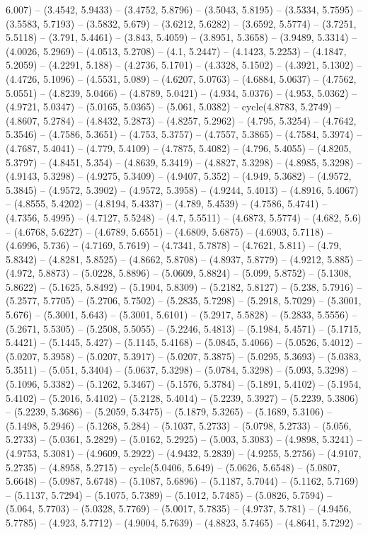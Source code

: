 6.007) -- (3.4542, 5.9433) -- (3.4752, 5.8796) -- (3.5043, 5.8195) -- (3.5334, 5.7595) -- (3.5583, 5.7193) -- (3.5832, 5.679) -- (3.6212, 5.6282) -- (3.6592, 5.5774) -- (3.7251, 5.5118) -- (3.791, 5.4461) -- (3.843, 5.4059) -- (3.8951, 5.3658) -- (3.9489, 5.3314) -- (4.0026, 5.2969) -- (4.0513, 5.2708) -- (4.1, 5.2447) -- (4.1423, 5.2253) -- (4.1847, 5.2059) -- (4.2291, 5.188) -- (4.2736, 5.1701) -- (4.3328, 5.1502) -- (4.3921, 5.1302) -- (4.4726, 5.1096) -- (4.5531, 5.089) -- (4.6207, 5.0763) -- (4.6884, 5.0637) -- (4.7562, 5.0551) -- (4.8239, 5.0466) -- (4.8789, 5.0421) -- (4.934, 5.0376) -- (4.953, 5.0362) -- (4.9721, 5.0347) -- (5.0165, 5.0365) -- (5.061, 5.0382) -- cycle(4.8783, 5.2749) -- (4.8607, 5.2784) -- (4.8432, 5.2873) -- (4.8257, 5.2962) -- (4.795, 5.3254) -- (4.7642, 5.3546) -- (4.7586, 5.3651) -- (4.753, 5.3757) -- (4.7557, 5.3865) -- (4.7584, 5.3974) -- (4.7687, 5.4041) -- (4.779, 5.4109) -- (4.7875, 5.4082) -- (4.796, 5.4055) -- (4.8205, 5.3797) -- (4.8451, 5.354) -- (4.8639, 5.3419) -- (4.8827, 5.3298) -- (4.8985, 5.3298) -- (4.9143, 5.3298) -- (4.9275, 5.3409) -- (4.9407, 5.352) -- (4.949, 5.3682) -- (4.9572, 5.3845) -- (4.9572, 5.3902) -- (4.9572, 5.3958) -- (4.9244, 5.4013) -- (4.8916, 5.4067) -- (4.8555, 5.4202) -- (4.8194, 5.4337) -- (4.789, 5.4539) -- (4.7586, 5.4741) -- (4.7356, 5.4995) -- (4.7127, 5.5248) -- (4.7, 5.5511) -- (4.6873, 5.5774) -- (4.682, 5.6) -- (4.6768, 5.6227) -- (4.6789, 5.6551) -- (4.6809, 5.6875) -- (4.6903, 5.7118) -- (4.6996, 5.736) -- (4.7169, 5.7619) -- (4.7341, 5.7878) -- (4.7621, 5.811) -- (4.79, 5.8342) -- (4.8281, 5.8525) -- (4.8662, 5.8708) -- (4.8937, 5.8779) -- (4.9212, 5.885) -- (4.972, 5.8873) -- (5.0228, 5.8896) -- (5.0609, 5.8824) -- (5.099, 5.8752) -- (5.1308, 5.8622) -- (5.1625, 5.8492) -- (5.1904, 5.8309) -- (5.2182, 5.8127) -- (5.238, 5.7916) -- (5.2577, 5.7705) -- (5.2706, 5.7502) -- (5.2835, 5.7298) -- (5.2918, 5.7029) -- (5.3001, 5.676) -- (5.3001, 5.643) -- (5.3001, 5.6101) -- (5.2917, 5.5828) -- (5.2833, 5.5556) -- (5.2671, 5.5305) -- (5.2508, 5.5055) -- (5.2246, 5.4813) -- (5.1984, 5.4571) -- (5.1715, 5.4421) -- (5.1445, 5.427) -- (5.1145, 5.4168) -- (5.0845, 5.4066) -- (5.0526, 5.4012) -- (5.0207, 5.3958) -- (5.0207, 5.3917) -- (5.0207, 5.3875) -- (5.0295, 5.3693) -- (5.0383, 5.3511) -- (5.051, 5.3404) -- (5.0637, 5.3298) -- (5.0784, 5.3298) -- (5.093, 5.3298) -- (5.1096, 5.3382) -- (5.1262, 5.3467) -- (5.1576, 5.3784) -- (5.1891, 5.4102) -- (5.1954, 5.4102) -- (5.2016, 5.4102) -- (5.2128, 5.4014) -- (5.2239, 5.3927) -- (5.2239, 5.3806) -- (5.2239, 5.3686) -- (5.2059, 5.3475) -- (5.1879, 5.3265) -- (5.1689, 5.3106) -- (5.1498, 5.2946) -- (5.1268, 5.284) -- (5.1037, 5.2733) -- (5.0798, 5.2733) -- (5.056, 5.2733) -- (5.0361, 5.2829) -- (5.0162, 5.2925) -- (5.003, 5.3083) -- (4.9898, 5.3241) -- (4.9753, 5.3081) -- (4.9609, 5.2922) -- (4.9432, 5.2839) -- (4.9255, 5.2756) -- (4.9107, 5.2735) -- (4.8958, 5.2715) -- cycle(5.0406, 5.649) -- (5.0626, 5.6548) -- (5.0807, 5.6648) -- (5.0987, 5.6748) -- (5.1087, 5.6896) -- (5.1187, 5.7044) -- (5.1162, 5.7169) -- (5.1137, 5.7294) -- (5.1075, 5.7389) -- (5.1012, 5.7485) -- (5.0826, 5.7594) -- (5.064, 5.7703) -- (5.0328, 5.7769) -- (5.0017, 5.7835) -- (4.9737, 5.781) -- (4.9456, 5.7785) -- (4.923, 5.7712) -- (4.9004, 5.7639) -- (4.8823, 5.7465) -- (4.8641, 5.7292) -- 